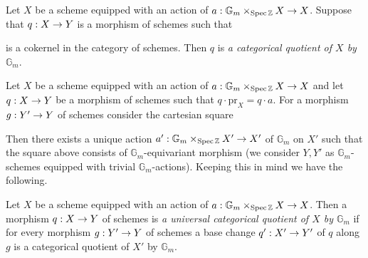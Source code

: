 \begin{definition}
Let $X$ be a scheme equipped with an action of $a:\mathbb{G}_m\times_{\mathrm{Spec}\, {\mathbb Z}}X\rightarrow X$. Suppose that $q:X\rightarrow Y$ is a morphism of schemes such that 
\begin{center}
\end{center}
is a cokernel in the category of schemes. Then $q$ is \textit{a categorical quotient of $X$ by $\mathbb{G}_m$}.
\end{definition}
\noindent
Let $X$ be a scheme equipped with an action of $a:\mathbb{G}_m\times_{\mathrm{Spec}\, {\mathbb Z}}X\rightarrow X$ and let $q:X\rightarrow Y$ be a morphism of schemes such that $q\cdot \mathrm{pr}_X = q\cdot a$. For a morphism $g:Y'\rightarrow Y$ of schemes consider the cartesian square
\begin{center}
\end{center} 
Then there exists a unique action $a':\mathbb{G}_m \times_{\mathrm{Spec}\, {\mathbb Z}}X' \rightarrow X'$ of $\mathbb{G}_m$ on $X'$ such that the square above consists of $\mathbb{G}_m$-equivariant morphism (we consider $Y,Y'$ as $\mathbb{G}_m$-schemes equipped with trivial $\mathbb{G}_m$-actions). Keeping this in mind we have the following.

\begin{definition}
Let $X$ be a scheme equipped with an action of $a:\mathbb{G}_m\times_{\mathrm{Spec}\, {\mathbb Z}}X\rightarrow X$. Then a morphism $q:X\rightarrow Y$ of schemes is \textit{a universal categorical quotient of $X$ by $\mathbb{G}_m$} if for every morphism $g:Y'\rightarrow Y$ of schemes a base change $q':X'\rightarrow Y'$ of $q$ along $g$ is a categorical quotient of $X'$ by $\mathbb{G}_m$. 
\end{definition}

